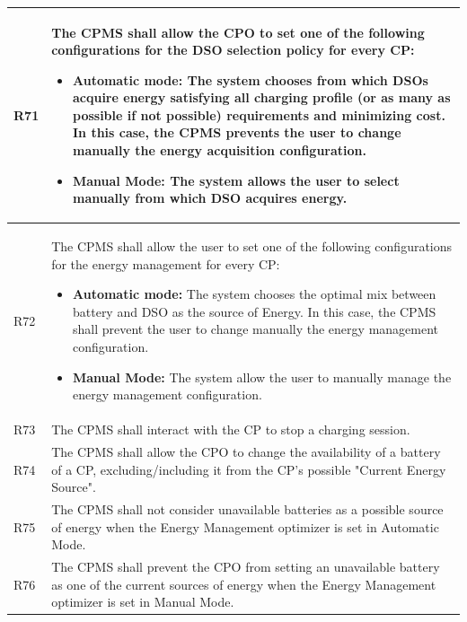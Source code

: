 \documentclass{Configuration_Files/PoliMi3i_thesis}
\begin{document}
\begin{xltabular}{\textwidth}{| >{}l | X |}
R71 &
    The CPMS shall allow the CPO to set one of the following configurations for the DSO selection policy for every CP:
    \begin{itemize}
        \item \textbf{Automatic mode:} The system chooses from which DSOs acquire energy satisfying all charging profile (or as many as possible if not possible) requirements and minimizing cost. In this case, the CPMS prevents the user to change manually the energy acquisition configuration.
        \item \textbf{Manual Mode:} The system allows the user to select manually from which DSO acquires energy.
    \end{itemize}\B\\
\hline
    
R72 &
    The CPMS shall allow the user to set one of the following configurations for the energy management  for every CP:
    \begin{itemize}
        \item \textbf{Automatic mode:} The system chooses the optimal mix between battery and DSO as the source of Energy. In this case, the CPMS shall prevent the user to change manually the energy management configuration.
        \item \textbf{Manual Mode:} The system allow the user to manually  manage the energy management configuration.
    \end{itemize}\B\\
\hline

R73 &
    The CPMS shall interact with the CP to stop a charging session.\B\\
\hline


R74 &
    The CPMS shall allow the CPO to change the availability of a battery of a CP, excluding/including it from the CP's possible "Current Energy Source".\B\\
\hline
    
R75 &
    The CPMS shall not consider unavailable batteries as  a possible source of energy when the Energy Management optimizer is set in Automatic Mode.\B\\
\hline

R76 &
    The CPMS shall prevent the CPO from setting an unavailable battery as one of the current sources of energy when the Energy Management optimizer is set in Manual Mode.\B\\
\hline


\end{xltabular}
\end{document}
